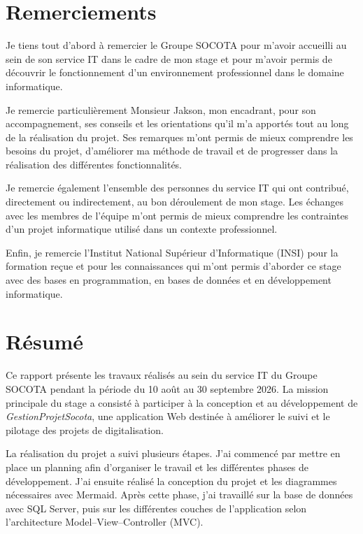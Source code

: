 \documentclass[12pt,a4paper,oneside]{report}
\begin{document}

\chapter*{Remerciements}

Je tiens tout d'abord à remercier le Groupe SOCOTA pour m'avoir accueilli au sein de son service IT dans le cadre de mon stage et pour m'avoir permis de découvrir le fonctionnement d'un environnement professionnel dans le domaine informatique.

Je remercie particulièrement Monsieur Jakson, mon encadrant, pour son accompagnement, ses conseils et les orientations qu'il m'a apportés tout au long de la réalisation du projet. Ses remarques m'ont permis de mieux comprendre les besoins du projet, d'améliorer ma méthode de travail et de progresser dans la réalisation des différentes fonctionnalités.

Je remercie également l'ensemble des personnes du service IT qui ont contribué, directement ou indirectement, au bon déroulement de mon stage. Les échanges avec les membres de l'équipe m'ont permis de mieux comprendre les contraintes d'un projet informatique utilisé dans un contexte professionnel.

Enfin, je remercie l'Institut National Supérieur d'Informatique (INSI) pour la formation reçue et pour les connaissances qui m'ont permis d'aborder ce stage avec des bases en programmation, en bases de données et en développement informatique.

\chapter*{Résumé}

Ce rapport présente les travaux réalisés au sein du service IT du Groupe SOCOTA pendant la période du 10 août au 30 septembre 2026. La mission principale du stage a consisté à participer à la conception et au développement de \textit{GestionProjetSocota}, une application Web destinée à améliorer le suivi et le pilotage des projets de digitalisation.

La réalisation du projet a suivi plusieurs étapes. J'ai commencé par mettre en place un planning afin d'organiser le travail et les différentes phases de développement. J'ai ensuite réalisé la conception du projet et les diagrammes nécessaires avec Mermaid. Après cette phase, j'ai travaillé sur la base de données avec SQL Server, puis sur les différentes couches de l'application selon l'architecture Model--View--Controller (MVC).
\end{document}
